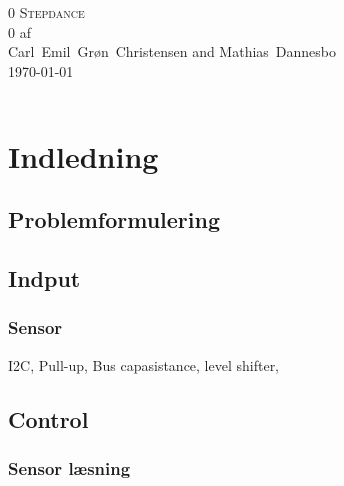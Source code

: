 \documentclass[a4paper,oneside,article,danish,table,draft]{memoir}
\newcommand{\authorvar}{Carl~Emil~Grøn~Christensen and Mathias~Dannesbo}
\newcommand{\pretitlevar}{0}
\newcommand{\titlevar}{Stepdance}
\newcommand{\subtitlevar}{0}
\newcommand{\datevar}{\today}
\begin{document}

\begin{center}
  \if\pretitlevar 0
  \else{\Large\pretitlevar\\} \fi
  \textsc{\HUGE\titlevar\\}
  \if\subtitlevar 0
  \else {\Large\subtitlevar\\} \fi
  {\LARGE 
  af\\
   \authorvar}\\
 \datevar\\
\end{center}

\vfill
\begin{abstract} %
\end{abstract}\vfill
\noindent
\begin{tabular*}{\textwidth}{@{\extracolsep{\fill}} ll}

\end{tabular*}

\thispagestyle{empty}
\clearpage
\setcounter{tocdepth}{2} \tableofcontents \clearpage


\chapter{Indledning}\label{chap:ind}
\section{Problemformulering}
\begin{itemize}
\end{itemize}



\section{Indput}

\subsection{Sensor}
I2C, Pull-up, Bus capasistance, level shifter,

\section{Control}

\subsection{Sensor læsning}
\end{document}
